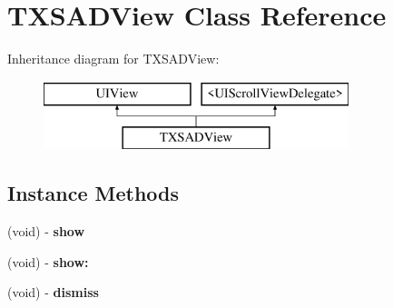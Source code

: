 \hypertarget{interface_t_x_s_a_d_view}{}\section{T\+X\+S\+A\+D\+View Class Reference}
\label{interface_t_x_s_a_d_view}
Inheritance diagram for T\+X\+S\+A\+D\+View\+:\begin{figure}[H]
\begin{center}
\leavevmode
\includegraphics[height=2.000000cm]{interface_t_x_s_a_d_view}
\end{center}
\end{figure}
\subsection*{Instance Methods}
\begin{DoxyCompactItemize}
\item 
\hypertarget{interface_t_x_s_a_d_view_ac7a5b9ac7f378c2e000599af3004afef}{}(void) -\/ {\bfseries show}\label{interface_t_x_s_a_d_view_ac7a5b9ac7f378c2e000599af3004afef}

\item 
\hypertarget{interface_t_x_s_a_d_view_ab2cd37d932fb08e2df1019a2fda41db4}{}(void) -\/ {\bfseries show\+:}\label{interface_t_x_s_a_d_view_ab2cd37d932fb08e2df1019a2fda41db4}

\item 
\hypertarget{interface_t_x_s_a_d_view_ab8bf43222a3345b176e4eac5ae25d0e7}{}(void) -\/ {\bfseries dismiss}\label{interface_t_x_s_a_d_view_ab8bf43222a3345b176e4eac5ae25d0e7}

\end{DoxyCompactItemize}
